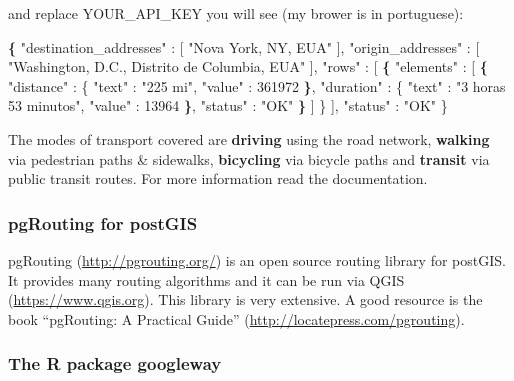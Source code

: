 \documentclass[12pt,graybox,envcountchap,sectrefs]{krantz}
\makeatletter
\newenvironment{Shaded}{\begin{snugshade}}{\end{snugshade}}
\newcommand{\KeywordTok}[1]{\textcolor[rgb]{0.13,0.29,0.53}{\textbf{#1}}}
\newcommand{\StringTok}[1]{\textcolor[rgb]{0.31,0.60,0.02}{#1}}
\newcommand{\BuiltInTok}[1]{#1}
\newcommand{\NormalTok}[1]{#1}
\newenvironment{kframe}{%
\medskip{}
\setlength{\fboxsep}{.8em}
 \def\at@end@of@kframe{}%
 \ifinner\ifhmode%
  \def\at@end@of@kframe{\end{minipage}}%
  \begin{minipage}{\columnwidth}%
 \fi\fi%
 \def\FrameCommand##1{\hskip\@totalleftmargin \hskip-\fboxsep
 \colorbox{shadecolor}{##1}\hskip-\fboxsep
     \hskip-\linewidth \hskip-\@totalleftmargin \hskip\columnwidth}%
 \MakeFramed {\advance\hsize-\width
   \@totalleftmargin\z@ \linewidth\hsize
   \@setminipage}}%
 {\par\unskip\endMakeFramed%
 \at@end@of@kframe}
\renewenvironment{Shaded}{\begin{kframe}}{\end{kframe}}
\theoremstyle{definition}
\theoremstyle{definition}
\theoremstyle{definition}
\theoremstyle{remark}
\makeatother
\begin{document}
and replace YOUR\_API\_KEY you will see (my brower is in portuguese):

\begin{Shaded}
\begin{Highlighting}[]
\KeywordTok{\{}
  \StringTok{"destination_addresses"} \BuiltInTok{:}\NormalTok{ [ }\StringTok{"Nova York, NY, EUA"}\NormalTok{ ],}
  \StringTok{"origin_addresses"} \BuiltInTok{:}\NormalTok{ [ }\StringTok{"Washington, D.C., Distrito de Columbia, EUA"}\NormalTok{ ],}
  \StringTok{"rows"} \BuiltInTok{:}\NormalTok{ [}
    \KeywordTok{\{}
      \StringTok{"elements"} \BuiltInTok{:}\NormalTok{ [}
        \KeywordTok{\{}
          \StringTok{"distance"} \BuiltInTok{:}\NormalTok{ \{}
            \StringTok{"text"} \BuiltInTok{:} \StringTok{"225 mi"}\NormalTok{,}
            \StringTok{"value"} \BuiltInTok{:}\NormalTok{ 361972}
          \KeywordTok{\}}\NormalTok{,}
          \StringTok{"duration"} \BuiltInTok{:}\NormalTok{ \{}
            \StringTok{"text"} \BuiltInTok{:} \StringTok{"3 horas 53 minutos"}\NormalTok{,}
            \StringTok{"value"} \BuiltInTok{:}\NormalTok{ 13964}
          \KeywordTok{\}}\NormalTok{,}
          \StringTok{"status"} \BuiltInTok{:} \StringTok{"OK"}
        \KeywordTok{\}}
\NormalTok{        ]}
\NormalTok{    \}}
\NormalTok{    ],}
  \StringTok{"status"} \BuiltInTok{:} \StringTok{"OK"}
\NormalTok{\}}
\end{Highlighting}
\end{Shaded}

The modes of transport covered are \textbf{driving} using the road
network, \textbf{walking} via pedestrian paths \& sidewalks,
\textbf{bicycling} via bicycle paths and \textbf{transit} via public
transit routes. For more information read the documentation.

\subsubsection{pgRouting for postGIS}\label{pgrouting-for-postgis}

pgRouting (\url{http://pgrouting.org/}) is an open source routing
library for postGIS. It provides many routing algorithms and it can be
run via QGIS (\url{https://www.qgis.org}). This library is very
extensive. A good resource is the book ``pgRouting: A Practical Guide''
(\url{http://locatepress.com/pgrouting}).

\subsubsection{The R package googleway}\label{the-r-package-googleway}
\end{document}
